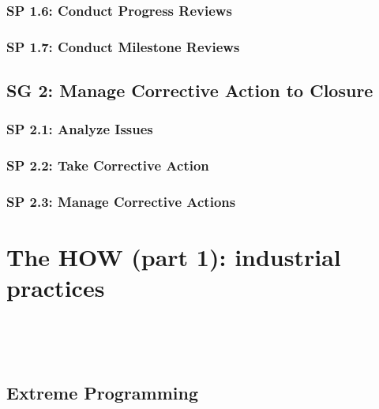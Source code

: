 \documentclass[accentcolor=tud1b]{tudbeamer}
\newcommand{\strong}[1]{\textaccentcolor{\textsf{\textbf{#1}}}}
\newenvironment{tframe}{
	\begin{frame}
	\frametitle{\ifnum\Level=2\insertsectionhead\fi\ifnum\Level=3\insertsectionhead\\\strong{\insertsubsectionhead}\fi\ifnum\Level=4\insertsubsectionhead\\\strong{\insertsubsubsectionhead}\fi
	}
}{
	\end{frame}
}
\begin{document}
\subsubsection{SP 1.6: Conduct Progress Reviews}

\subsubsection{SP 1.7: Conduct Milestone Reviews}

\subsection{SG 2: Manage Corrective Action to Closure}

\subsubsection{SP 2.1: Analyze Issues}

\subsubsection{SP 2.2: Take Corrective Action}

\subsubsection{SP 2.3: Manage Corrective Actions}

\section{The HOW (part 1): industrial practices}
\begin{tframe}
	
\cite{alegria2006cmmiagile}

\end{tframe}

\subsection{Extreme Programming}
\begin{tframe}

\end{tframe}
\end{document}
